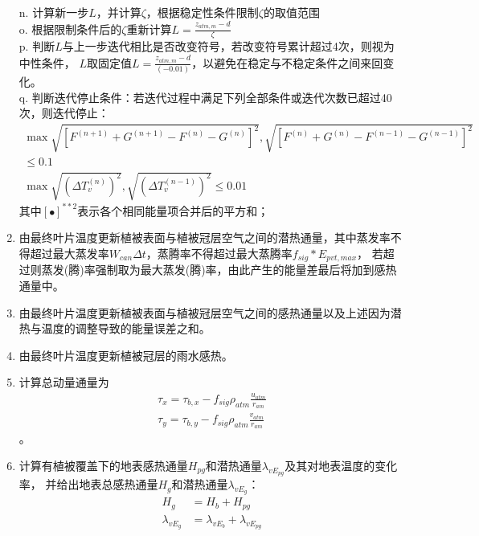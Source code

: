 \begin{enumerate}
    n. 计算新一步$L$，并计算$\zeta$，根据稳定性条件限制$\zeta$的取值范围 \\
    o. 根据限制条件后的$\zeta$重新计算$L=\frac{z_{atm,m}-d}{\zeta}$ \\
    p. 判断$L$与上一步迭代相比是否改变符号，若改变符号累计超过4次，则视为中性条件，
    $L$取固定值$L=\frac{z_{atm,m}-d}{\left(-0.01\right)}$，以避免在稳定与不稳定条件之间来回变化。\\
    q. 判断迭代停止条件：若迭代过程中满足下列全部条件或迭代次数已超过40次，则迭代停止：
    \begin{equation}
        \begin{array}{c}\max \sqrt{\left[F^{(n+1)}+G^{(n+1)}-F^{(n)}-G^{(n)}\right]^{2}}, \sqrt{\left[F^{(n)}+G^{(n)}-F^{(n-1)}-G^{(n-1)}\right]^{2}} \\ \leq 0.1 \\ \max \sqrt{\left(\Delta T_{v}^{(n)}\right)^{2}}, \sqrt{\left(\Delta T_{v}^{(n-1)}\right)^{2}} \leq 0.01\end{array}
    \end{equation}
    其中$\left[\bullet\right]^{\ast\ast2}$表示各个相同能量项合并后的平方和；
    \item 由最终叶片温度更新植被表面与植被冠层空气之间的潜热通量，其中蒸发率不得超过最大蒸发率$W_{can} \Delta t$，蒸腾率不得超过最大蒸腾率$f_{sig}\ast E_{pvt,max}$，
    若超过则蒸发(腾)率强制取为最大蒸发(腾)率，由此产生的能量差最后将加到感热通量中。
    \item 由最终叶片温度更新植被表面与植被冠层空气之间的感热通量以及上述因为潜热与温度的调整导致的能量误差之和。
    \item 由最终叶片温度更新植被冠层的雨水感热。
    \item 计算总动量通量为
    \begin{equation}
    \begin{array}{c}\tau_{x}=\tau_{b,x}-f_{sig} \rho_{atm} \frac{u_{atm}}{r_{a m}} \\ 
        \tau_{y}=\tau_{b,y}-f_{sig} \rho_{atm} \frac{v_{atm}}{r_{am}}\end{array}
    \end{equation}。
    \item 计算有植被覆盖下的地表感热通量$H_{pg}$和潜热通量$\lambda_{vE_{pg}}$及其对地表温度的变化率，
    并给出地表总感热通量$H_g$和潜热通量$\lambda_{vE_g}$：
    \begin{equation}
    \begin{aligned} H_{g} &=H_{b}+H_{p g} \\ \lambda_{vE_{g}} &=\lambda_{vE_{b}}+\lambda_{vE_{pg}} \end{aligned}

\end{equation}
\end{enumerate}
